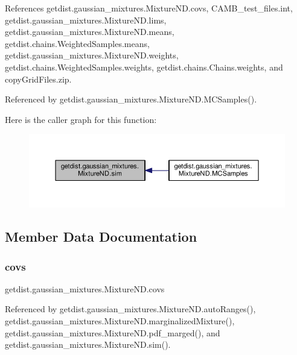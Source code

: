 References getdist.\+gaussian\+\_\+mixtures.\+Mixture\+N\+D.\+covs, C\+A\+M\+B\+\_\+test\+\_\+files.\+int, getdist.\+gaussian\+\_\+mixtures.\+Mixture\+N\+D.\+lims, getdist.\+gaussian\+\_\+mixtures.\+Mixture\+N\+D.\+means, getdist.\+chains.\+Weighted\+Samples.\+means, getdist.\+gaussian\+\_\+mixtures.\+Mixture\+N\+D.\+weights, getdist.\+chains.\+Weighted\+Samples.\+weights, getdist.\+chains.\+Chains.\+weights, and copy\+Grid\+Files.\+zip.



Referenced by getdist.\+gaussian\+\_\+mixtures.\+Mixture\+N\+D.\+M\+C\+Samples().

Here is the caller graph for this function\+:
\nopagebreak
\begin{figure}[H]
\begin{center}
\leavevmode
\includegraphics[width=350pt]{classgetdist_1_1gaussian__mixtures_1_1MixtureND_a59cc8f909638f1b571279518b9285089_icgraph}
\end{center}
\end{figure}


\subsection{Member Data Documentation}
\mbox{\label{classgetdist_1_1gaussian__mixtures_1_1MixtureND_a51e91169ecb626b2ca59779abeed17b7}} 
\subsubsection{\texorpdfstring{covs}{covs}}
{\footnotesize\ttfamily getdist.\+gaussian\+\_\+mixtures.\+Mixture\+N\+D.\+covs}



Referenced by getdist.\+gaussian\+\_\+mixtures.\+Mixture\+N\+D.\+auto\+Ranges(), getdist.\+gaussian\+\_\+mixtures.\+Mixture\+N\+D.\+marginalized\+Mixture(), getdist.\+gaussian\+\_\+mixtures.\+Mixture\+N\+D.\+pdf\+\_\+marged(), and getdist.\+gaussian\+\_\+mixtures.\+Mixture\+N\+D.\+sim().

